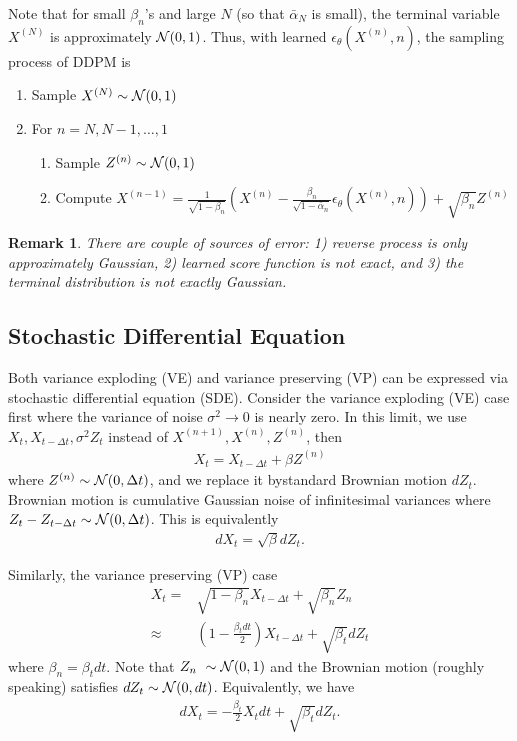 \documentclass[11pt, a4paper]{article}
\newtheorem{remark}{Remark}
\begin{document}
Note that for small $\beta_n$'s and large $N$ (so that $\bar{\alpha}_N$ is small),
the terminal variable $X^{(N)}$ is approximately ${\cal N}(0, 1)$.
Thus, with learned $\epsilon_\theta(X^{(n)}, n)$, the sampling process of DDPM is 
\begin{enumerate}
    \item Sample $X^{(N)} \sim {\cal N}(0, 1)$
    \item For $n= N, N-1, \dots, 1$
    \begin{enumerate}
        \item Sample $Z^{(n)} \sim {\cal N}(0, 1)$
        \item Compute $X^{(n-1)} = \frac{1}{\sqrt{1-\beta_n}} \left(X^{(n)} - \frac{\beta_n}{\sqrt{1-\bar{\alpha}_n}}\epsilon_\theta(X^{(n)}, n)\right) + \sqrt{\beta_n} Z^{(n)}$
    \end{enumerate}
\end{enumerate}

\begin{remark}
    There are couple of sources of error: 1) reverse process is only approximately Gaussian,
    2) learned score function is not exact, and 3) the terminal distribution is not exactly Gaussian.
\end{remark}

\subsection{Stochastic Differential Equation}
Both variance exploding (VE) and variance preserving (VP) can be expressed via stochastic differential equation (SDE).
Consider the variance exploding (VE) case first where the variance of noise $\sigma^2\rightarrow 0$ is nearly zero.
In this limit, we use $X_t, X_{t-\Delta t}, \sigma^2 Z_t$ instead of $X^{(n+1)}, X^{(n)}, Z^{(n)}$, then
\begin{align}
    X_{t} = X_{t-\Delta t} + \beta Z^{(n)}
\end{align}
where $Z^{(n)}\sim {\cal N}(0, \Delta t)$, and we replace it bystandard Brownian motion $dZ_t$.
Brownian motion is cumulative Gaussian noise of infinitesimal variances where $Z_t-Z_{t-\Delta t}\sim {\cal N}(0, \Delta t)$.
This is equivalently
\begin{align}
    dX_{t} = \sqrt{\beta} dZ_t.
\end{align}

Similarly, the variance preserving (VP) case 
\begin{align}
    X_{t} =& \sqrt{1-\beta_n}X_{t-\Delta t} + \sqrt{\beta_n}Z_n\\
    \approx& \left(1-\frac{\beta_t dt}{2}\right)X_{t-\Delta t} + \sqrt{\beta_t} dZ_t
\end{align}
where $\beta_n = \beta_t dt$.
Note that $Z_n~\sim {\cal N}(0, 1)$ and the Brownian motion (roughly speaking) satisfies $dZ_t\sim{\cal N}(0, dt)$.
Equivalently, we have
\begin{align}
    dX_{t} = -\frac{\beta_t}{2} X_t dt + \sqrt{\beta_t}dZ_t.
\end{align}
\end{document}

